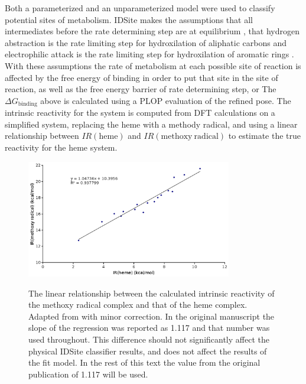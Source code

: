 Both a parameterized and an unparameterized model were used to classify potential sites of metabolism.
IDSite makes the assumptions that all intermediates before the rate determining step are at equilibrium \cite{wang2007stochastic}, that hydrogen abstraction is the rate limiting step for hydroxilation of aliphatic carbons and electrophilic attack is the rate limiting step for hydroxilation of aromatic rings \cite{guengerich2001common,shaik2005theoretical}.
With these assumptions the rate of metabolism at each possible site of reaction is affected by the free energy of binding in order to put that site in the site of reaction, as well as the free energy barrier of rate determining step, or
The ${\Delta}G_{\mathrm{binding}}$ above is calculated using a PLOP evaluation of the refined pose.
The intrinsic reactivity for the system is computed from DFT calculations on a simplified system, replacing the heme with a methody radical, and using a linear relationship between $IR(\mathrm{heme})$ and $IR(\mathrm{methoxy\ radical})$ to estimate the true reactivity for the heme system.
\begin{figure}[h]
\centering
\includegraphics[width=0.8\textwidth]{figures/idsite/intrinsic_corrected.png}
\label{fig:idsite/intrinsic}
\caption{The linear relationship between the calculated intrinsic reactivity of the methoxy radical complex and that of the heme complex.
Adapted from \protect\cite{li2011idsite} with minor correction.
In the original manuscript the slope of the regression was reported as 1.117 and that number was used throughout.
This difference should not significantly affect the physical IDSite classifier results, and does not affect the results of the fit model.
In the rest of this text the value from the original publication of 1.117 will be used.}
\end{figure}

